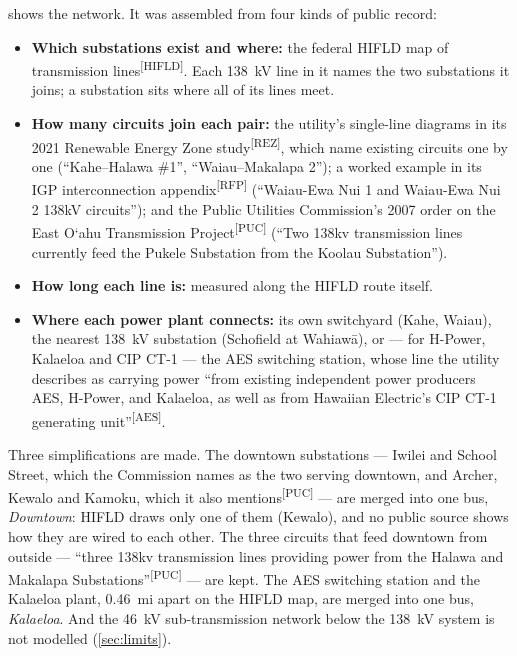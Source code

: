 \documentclass[11pt,a4paper]{article}
\newcommand{\okina}{\textquoteleft}
\newcommand{\Oahu}{O\okina ahu}
\newcommand{\src}[1]{\textsuperscript{[#1]}}
\begin{document}
 shows the network. It was assembled from four kinds of public record:
\begin{itemize}
  \item \textbf{Which substations exist and where:} the federal HIFLD map of
        transmission lines\src{HIFLD}. Each \SI{138}{kV} line in it names the two
        substations it joins; a substation sits where all of its lines meet.
  \item \textbf{How many circuits join each pair:} the utility's single-line diagrams
        in its 2021 Renewable Energy Zone study\src{REZ}, which name existing circuits
        one by one (``Kahe--Halawa \#1'', ``Waiau--Makalapa 2''); a worked example
        in its IGP interconnection appendix\src{RFP} (``Waiau-Ewa Nui 1 and Waiau-Ewa Nui
        2 138kV circuits'');
        and the Public Utilities Commission's 2007 order on the East \Oahu{}
        Transmission Project\src{PUC} (``Two 138kv transmission lines currently feed
        the Pukele Substation from the Koolau Substation'').
  \item \textbf{How long each line is:} measured along the HIFLD route itself.
  \item \textbf{Where each power plant connects:} its own switchyard (Kahe, Waiau), the
        nearest \SI{138}{kV} substation (Schofield at Wahiaw\=a), or --- for H-Power,
        Kalaeloa and CIP CT-1 --- the AES switching station, whose line the utility
        describes as carrying power ``from existing independent power producers AES,
        H-Power, and Kalaeloa, as well as from Hawaiian Electric's CIP CT-1 generating
        unit''\src{AES}.
\end{itemize}

Three simplifications are made. The downtown substations --- Iwilei and School Street,
which the Commission names as the two serving downtown, and Archer, Kewalo and Kamoku,
which it also mentions\src{PUC} --- are merged into one bus, \emph{Downtown}: HIFLD draws
only one of them (Kewalo), and no public source shows how they are wired to each other.
The three circuits that feed downtown from outside --- ``three 138kv transmission lines
providing power from the Halawa and Makalapa Substations''\src{PUC} --- are kept. The
AES switching station and the Kalaeloa plant, \SI{0.46}{mi} apart on the HIFLD map, are
merged into one bus, \emph{Kalaeloa}. And the
\SI{46}{kV} sub-transmission network below the \SI{138}{kV} system is not modelled
(\cref{sec:limits}).
\end{document}
